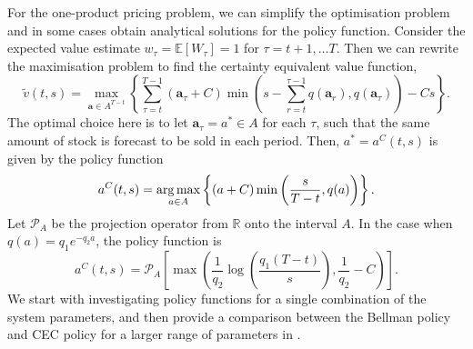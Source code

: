 \documentclass[main.tex]{subfiles}
\begin{document}
For the one-product pricing problem, we can simplify the optimisation
problem and in some cases obtain analytical solutions for the policy function.
Consider the expected value estimate $w_\tau=\mathbb{E}
[W_\tau]=1$ for $\tau=t+1,\dots T$.
Then we can rewrite the maximisation problem to find
the certainty equivalent value function,
\begin{equation}
  \widetilde{v}(t,s)=
  \max_{\mathbf a\in A^{T-t}}\left\{\sum_{\tau=t}^{T-1}(\mathbf
    a_\tau+C)\min\left(s-\sum_{r=t}^{\tau-1}q(\mathbf a_r),q(\mathbf a_\tau)\right)-Cs\right\}.
\end{equation}
The optimal choice here is to let $\mathbf a_\tau=a^*\in A$ for each
$\tau$, such that the same amount of stock is forecast to be sold in
each period.
Then, $a^*=a^C(t,s)$ is given by the policy function
\begin{equation}
  a^C(t,s)=\operatorname*{arg\,max}_{a\in A} \left\{(a+C)\min\left(
      \frac{s}{T-t},q(a)
    \right)\right\}.
\end{equation}
Let $\mathcal{P}_A$ be the projection operator from $\mathbb{R}$ onto the interval $A$.
In the case when $q(a)=q_1e^{-q_2a}$, the policy function is
\begin{equation}\label{eq:cec_policy}
  a^C(t,s)=\mathcal{P}_A\left[
    \max\left( \frac{1}{q_2}\log\left( \frac{q_1(T-t)}{s}\right),
      \frac{1}{q_2}-C  \right)\right].
\end{equation}
We start with investigating policy functions for a
single combination of the  system
parameters, and then provide a
comparison between the Bellman policy and CEC policy for a larger
range of parameters in .
\end{document}
